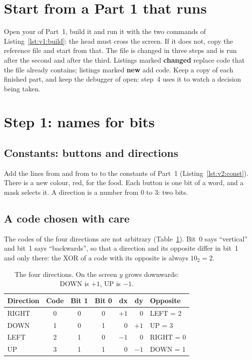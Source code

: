 \section{Start from a Part 1 that runs}

Open your  of Part~1, build it and run it with the two
commands of Listing~\ref{lst:v1:build}: the head must cross the screen. If it
does not, copy the reference file  and start from that.
The file is changed in three steps and is run after the second and after the
third. Listings marked \textbf{changed} replace code that the file already
contains; listings marked \textbf{new} add code. Keep a copy of each finished
part, and keep the debugger of \prgqt open: step~4 uses it to watch a decision
being taken.

\section{Step 1: names for bits}

\subsection{Constants: buttons and directions}

Add the lines from  and from  to  to
the constants of Part~1 (Listing~\ref{lst:v2:const}). There is a new colour,
red, for the food. Each button is one bit of a word, and a mask selects it. A
direction is a number from 0 to 3: two bits.


\subsection{A code chosen with care}

The codes of the four directions are not arbitrary
(Table~\ref{tab:v2:dirs}). Bit~0 says ``vertical'' and bit~1 says
``backwards'', so that a direction and its opposite differ in bit~1 and only
there: the XOR of a code with its opposite is always $10_2=2$.

\begin{table}[htb]
\centering\small
\caption{The four directions. On the screen $y$ grows downwards: DOWN is
$+1$, UP is $-1$.}\label{tab:v2:dirs}
\begin{tabular}{@{}lcccrrl@{}}
\toprule
\textbf{Direction} & \textbf{Code} & \textbf{Bit 1} & \textbf{Bit 0} & \textbf{dx} & \textbf{dy} & \textbf{Opposite}\\
\midrule
RIGHT & 0 & 0 & 0 & $+1$ & 0 & LEFT = 2\\
DOWN & 1 & 0 & 1 & 0 & $+1$ & UP = 3\\
LEFT & 2 & 1 & 0 & $-1$ & 0 & RIGHT = 0\\
UP & 3 & 1 & 1 & 0 & $-1$ & DOWN = 1\\
\bottomrule
\end{tabular}
\end{table}

